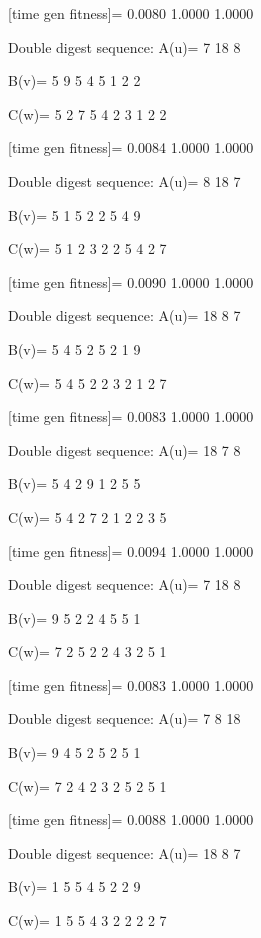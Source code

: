 [time gen fitness]=
    0.0080    1.0000    1.0000

Double digest sequence:
A(u)=
     7    18     8

B(v)=
     5     9     5     4     5     1     2     2

C(w)=
     5     2     7     5     4     2     3     1     2     2

[time gen fitness]=
    0.0084    1.0000    1.0000

Double digest sequence:
A(u)=
     8    18     7

B(v)=
     5     1     5     2     2     5     4     9

C(w)=
     5     1     2     3     2     2     5     4     2     7

[time gen fitness]=
    0.0090    1.0000    1.0000

Double digest sequence:
A(u)=
    18     8     7

B(v)=
     5     4     5     2     5     2     1     9

C(w)=
     5     4     5     2     2     3     2     1     2     7

[time gen fitness]=
    0.0083    1.0000    1.0000

Double digest sequence:
A(u)=
    18     7     8

B(v)=
     5     4     2     9     1     2     5     5

C(w)=
     5     4     2     7     2     1     2     2     3     5

[time gen fitness]=
    0.0094    1.0000    1.0000

Double digest sequence:
A(u)=
     7    18     8

B(v)=
     9     5     2     2     4     5     5     1

C(w)=
     7     2     5     2     2     4     3     2     5     1

[time gen fitness]=
    0.0083    1.0000    1.0000

Double digest sequence:
A(u)=
     7     8    18

B(v)=
     9     4     5     2     5     2     5     1

C(w)=
     7     2     4     2     3     2     5     2     5     1

[time gen fitness]=
    0.0088    1.0000    1.0000

Double digest sequence:
A(u)=
    18     8     7

B(v)=
     1     5     5     4     5     2     2     9

C(w)=
     1     5     5     4     3     2     2     2     2     7

